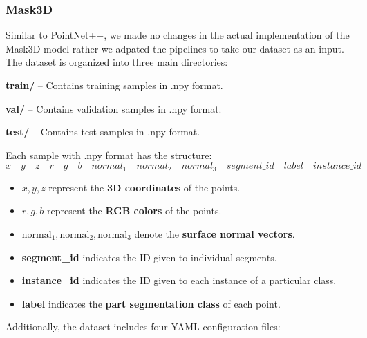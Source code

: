 \subsubsection{Mask3D}
Similar to PointNet++, we made no changes in the actual implementation of the Mask3D model rather we adpated the pipelines to take our dataset
as an input.
The dataset is organized into three main directories:
\begin{description}
  \item \textbf{train/} – Contains training samples in .npy format.
  \item \textbf{val/} – Contains validation samples in .npy format.
  \item \textbf{test/} – Contains test samples in .npy format.
\end{description}
Each sample with .npy format has the structure:
\begin{equation*}
x \quad y \quad z \quad r \quad g \quad b \quad normal_1 \quad normal_2 \quad normal_3 \quad segment\_id \quad label \quad instance\_id
\end{equation*}

\begin{itemize}
  \item \( x, y, z \) represent the \textbf{3D coordinates} of the points.
  \item \( r, g, b \) represent the \textbf{RGB colors} of the points.
  \item \( \text{normal}_1, \text{normal}_2, \text{normal}_3 \) denote the \textbf{surface normal vectors}.
  \item \textbf{segment\_id} indicates the ID given to individual segments.
  \item \textbf{instance\_id} indicates the ID given to each instance of a particular class.
  \item \textbf{label} indicates the \textbf{part segmentation class} of each point.
\end{itemize}
Additionally, the dataset includes four YAML configuration files:

